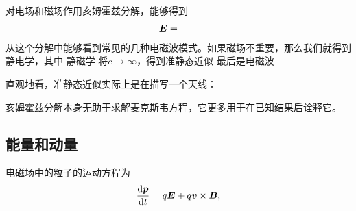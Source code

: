 对电场和磁场作用亥姆霍兹分解，能够得到
\begin{equation}
    \begin{aligned}
        \vb*{E} &= - 
    \end{aligned}
\end{equation}
从这个分解中能够看到常见的几种电磁波模式。如果磁场不重要，那么我们就得到静电学，其中
静磁学
将$c \to \infty$，得到准静态近似
最后是电磁波

直观地看，准静态近似实际上是在描写一个天线：

亥姆霍兹分解本身无助于求解麦克斯韦方程，它更多用于在已知结果后诠释它。

\subsection{能量和动量}

电磁场中的粒子的运动方程为
\begin{equation}
    \dv{\vb*{p}}{t} = q \vb*{E} + q \vb*{v} \times \vb*{B},
\end{equation}

